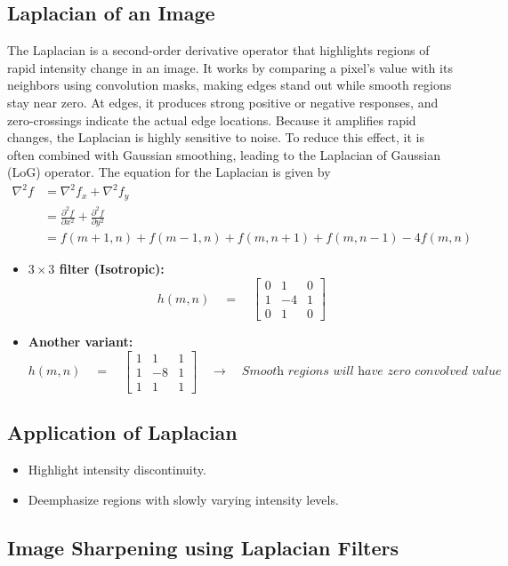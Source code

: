 \subsection{Laplacian of an Image}
The Laplacian is a second-order derivative operator that highlights regions of rapid intensity change in an image.
It works by comparing a pixel’s value with its neighbors using convolution masks, making edges stand out while smooth regions stay near zero.
At edges, it produces strong positive or negative responses, and zero-crossings indicate the actual edge locations.
Because it amplifies rapid changes, the Laplacian is highly sensitive to noise.
To reduce this effect, it is often combined with Gaussian smoothing, leading to the Laplacian of Gaussian (LoG) operator. The equation for the Laplacian is given by
\begin{align*}
\nabla^2 f &= \nabla^2 f_x + \nabla^2 f_y\\
&= \frac{\partial^2 f}{\partial x^2} + \frac{\partial^2 f}{\partial y^2} \\
&= f(m+1,n) + f(m-1,n) + f(m,n+1) + f(m,n-1) - 4f(m,n)
\end{align*}
\begin{itemize}
    \item \textbf{$3 \times 3$ filter (Isotropic):}
\[
h(m,n) \quad=\quad 
\begin{bmatrix}
0 & 1 & 0 \\
1 & -4 & 1 \\
0 & 1 & 0
\end{bmatrix}
\]
\item \textbf{Another variant:}
\[
h(m,n) \quad=\quad
\begin{bmatrix}
1 & 1 & 1 \\
1 & -8 & 1 \\
1 & 1 & 1
\end{bmatrix}
\quad\rightarrow\quad \textit{Smooth regions will have zero convolved value}
\]
\end{itemize}
\subsection*{Application of Laplacian}
\begin{itemize}
    \item Highlight intensity discontinuity.
    \item Deemphasize regions with slowly varying intensity levels. 
\end{itemize}
\subsection*{Image Sharpening using Laplacian Filters}
\vspace{2pt}

